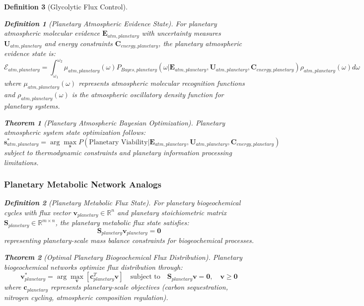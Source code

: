 \documentclass[12pt,a4paper]{article}
\newtheorem{theorem}{Theorem}
\newtheorem{definition}{Definition}
\begin{document}
\begin{definition}[Glycolytic Flux Control]
\begin{definition}[Planetary Atmospheric Evidence State]
For planetary atmospheric molecular evidence $\mathbf{E}_{atm,planetary}$ with uncertainty measures $\mathbf{U}_{atm,planetary}$ and energy constraints $\mathbf{C}_{energy,planetary}$, the planetary atmospheric evidence state is:
\begin{equation}
\mathcal{E}_{atm,planetary} = \int_{\omega_1}^{\omega_2} \mu_{atm,planetary}(\omega) P_{Bayes,planetary}(\omega | \mathbf{E}_{atm,planetary}, \mathbf{U}_{atm,planetary}, \mathbf{C}_{energy,planetary}) \rho_{atm,planetary}(\omega) d\omega
\end{equation}
where $\mu_{atm,planetary}(\omega)$ represents atmospheric molecular recognition functions and $\rho_{atm,planetary}(\omega)$ is the atmospheric oscillatory density function for planetary systems.
\end{definition}

\begin{theorem}[Planetary Atmospheric Bayesian Optimization]
Planetary atmospheric system state optimization follows:
\begin{equation}
\mathbf{s}^*_{atm,planetary} = \arg\max_{\mathbf{s}} P(\text{Planetary Viability} | \mathbf{E}_{atm,planetary}, \mathbf{U}_{atm,planetary}, \mathbf{C}_{energy,planetary})
\end{equation}
subject to thermodynamic constraints and planetary information processing limitations.
\end{theorem}

\subsubsection{Planetary Metabolic Network Analogs}

\begin{definition}[Planetary Metabolic Flux State]
For planetary biogeochemical cycles with flux vector $\mathbf{v}_{planetary} \in \mathbb{R}^n$ and planetary stoichiometric matrix $\mathbf{S}_{planetary} \in \mathbb{R}^{m \times n}$, the planetary metabolic flux state satisfies:
\begin{equation}
\mathbf{S}_{planetary} \mathbf{v}_{planetary} = \mathbf{0}
\end{equation}
representing planetary-scale mass balance constraints for biogeochemical processes.
\end{definition}

\begin{theorem}[Optimal Planetary Biogeochemical Flux Distribution]
Planetary biogeochemical networks optimize flux distribution through:
\begin{equation}
\mathbf{v}_{planetary}^* = \arg\max_{\mathbf{v}} \left[ \mathbf{c}_{planetary}^T \mathbf{v} \right] \quad \text{subject to} \quad \mathbf{S}_{planetary} \mathbf{v} = \mathbf{0}, \quad \mathbf{v} \geq \mathbf{0}
\end{equation}
where $\mathbf{c}_{planetary}$ represents planetary-scale objectives (carbon sequestration, nitrogen cycling, atmospheric composition regulation).
\end{theorem}


\end{definition}
\end{document}
